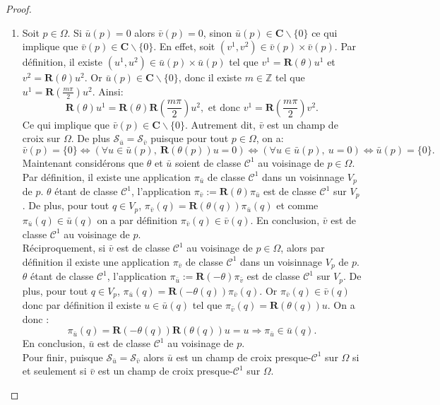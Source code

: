 \begin{proof}
\begin{enumerate}
\item Soit $p\in\Omega$. Si $\bar{u}(p)=0$ alors $\bar{v}(p)=0$, sinon $\bar{u}(p)\in\mathbf{C}\backslash\{0\}$ ce qui implique que $\bar{v}(p)\in\mathbf{C}\backslash\{0\}$. En effet, soit $(v^1, v^2)\in\bar{v}(p)\times\bar{v}(p)$. Par définition, il existe $(u^1, u^2)\in\bar{u}(p)\times\bar{u}(p)$ tel que $v^1=\mathbf{R}(\theta)u^1$ et $v^2=\mathbf{R}(\theta)u^2$. Or $\bar{u}(p)\in\mathbf{C}\backslash\{0\}$, donc il existe $m\in\mathbb{Z}$ tel que $u^1=\mathbf{R}\left(\frac{m\pi}{2}\right)u^2$. Ainsi:
$$
\mathbf{R}(\theta)u^1=\mathbf{R}(\theta)\mathbf{R}\left(\frac{m\pi}{2}\right)u^2,\mbox{ et donc }
v^1=\mathbf{R}\left(\frac{m\pi}{2}\right)v^2.
$$
Ce qui implique que $\bar{v}(p)\in\mathbf{C}\backslash\{0\}$. Autrement dit, $\bar{v}$ est un champ de croix sur $\Omega$. De plus $\mathcal{S}_{\bar{u}}=\mathcal{S}_{\bar{v}}$ puisque pour tout $p\in\Omega$, on a:
$$\bar{v}(p)=\{0\} \Leftrightarrow \left(\forall u\in \bar{u}(p),~\mathbf{R}(\theta(p)) u=0\right)\Leftrightarrow \left(\forall u\in \bar{u}(p),~u=0\right) \Leftrightarrow \bar{u}(p)=\{0\}.$$
Maintenant considérons que $\theta$  et $\bar{u}$ soient de classe $\mathcal{C}^1$ au voisinage de $p\in\Omega$. Par définition, il existe une application $\pi_{\bar{u}}$ de classe $\mathcal{C}^1$ dans un voisinnage $V_p$ de $p$. $\theta$ étant de classe $\mathcal{C}^1$, l'application $\pi_{\bar{v}}:=\mathbf{R}(\theta)\pi_{\bar{u}}$ est de classe $\mathcal{C}^1$ sur $V_p$. De plus, pour tout $q\in V_p$, $\pi_{\bar{v}}(q)=\mathbf{R}(\theta(q))\pi_{\bar{u}}(q)$ et comme $\pi_{\bar{u}}(q)\in\bar{u}(q)$ on a par définition $\pi_{\bar{v}}(q)\in\bar{v}(q)$. En conclusion, $\bar{v}$ est de classe $\mathcal{C}^1$ au voisinage de $p$.\\
Réciproquement, si $\bar{v}$ est de classe $\mathcal{C}^1$ au voisinage de $p\in\Omega$, alors par définition il existe une application $\pi_{\bar{v}}$ de classe $\mathcal{C}^1$ dans un voisinnage $V_p$ de $p$. $\theta$ étant de classe $\mathcal{C}^1$, l'application $\pi_{\bar{u}}:=\mathbf{R}(-\theta)\pi_{\bar{v}}$ est de classe $\mathcal{C}^1$ sur $V_p$. De plus, pour tout $q\in V_p$, $\pi_{\bar{u}}(q)=\mathbf{R}(-\theta(q))\pi_{\bar{v}}(q)$. Or $\pi_{\bar{v}}(q)\in\bar{v}(q)$ donc par définition il existe $u\in\bar{u}(q)$ tel que $\pi_{\bar{v}}(q)=\mathbf{R}(\theta(q))u$. On a donc :
$$
\pi_{\bar{u}}(q)=\mathbf{R}(-\theta(q))\mathbf{R}(\theta(q))u=u\Longrightarrow\pi_{\bar{u}}\in\bar{u}(q).
$$
En conclusion, $\bar{u}$ est de classe $\mathcal{C}^1$ au voisinage de $p$.\\
Pour finir, puisque $\mathcal{S}_{\bar{u}}=\mathcal{S}_{\bar{v}}$ alors $\bar{u}$ est un champ de croix presque-$\mathcal{C}^1$ sur $\Omega$ si et seulement si $\bar{v}$ est un champ de croix presque-$\mathcal{C}^1$ sur $\Omega$.
\end{enumerate}
\end{proof}

